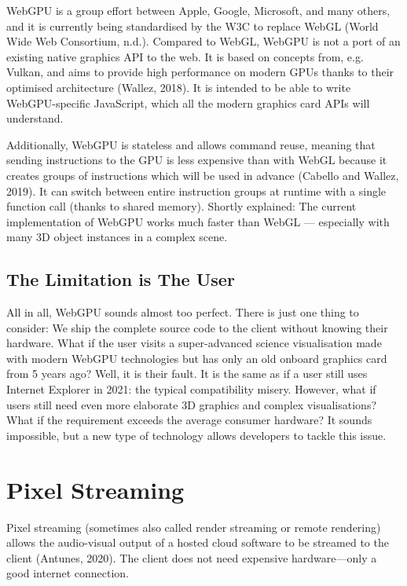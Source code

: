 \documentclass[10pt]{article}
\begin{document}
\begin{sloppypar}
  WebGPU is a group effort between Apple, Google, Microsoft, and many others, and it is currently being standardised by the W3C to replace WebGL (World Wide Web Consortium, n.d.). Compared to WebGL, WebGPU is not a port of an existing native graphics API to the web. It is based on concepts from, e.g. Vulkan, and aims to provide high performance on modern GPUs thanks to their optimised architecture (Wallez, 2018). It is intended to be able to write WebGPU-specific JavaScript, which all the modern graphics card APIs will understand.

  Additionally, WebGPU is stateless and allows command reuse, meaning that sending instructions to the GPU is less expensive than with WebGL because it creates groups of instructions which will be used in advance (Cabello and Wallez, 2019). It can switch between entire instruction groups at runtime with a single function call (thanks to shared memory). Shortly explained: The current implementation of WebGPU works much faster than WebGL — especially with many 3D object instances in a complex scene.

  \subsection{The Limitation is The User}
  \label{subsec:the-limitation-is-the-user}

  All in all, WebGPU sounds almost too perfect. There is just one thing to consider: We ship the complete source code to the client without knowing their hardware. What if the user visits a super-advanced science visualisation made with modern WebGPU technologies but has only an old onboard graphics card from 5 years ago? Well, it is their fault. It is the same as if a user still uses Internet Explorer in 2021: the typical compatibility misery. However, what if users still need even more elaborate 3D graphics and complex visualisations? What if the requirement exceeds the average consumer hardware? It sounds impossible, but a new type of technology allows developers to tackle this issue.

  \section{Pixel Streaming}
  \label{sec:pixel-streaming}

  Pixel streaming (sometimes also called render streaming or remote rendering) allows the audio-visual output of a hosted cloud software to be streamed to the client (Antunes, 2020). The client does not need expensive hardware—only a good internet connection.


\end{sloppypar}
\end{document}
